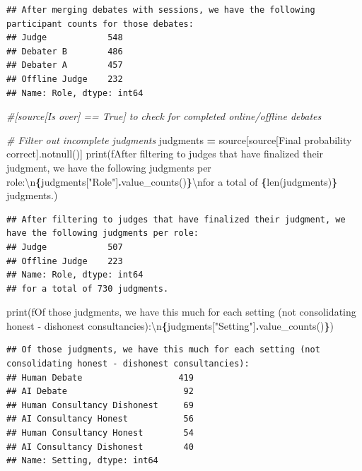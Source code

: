 \documentclass[
]{article}
\newenvironment{Shaded}{\begin{snugshade}}{\end{snugshade}}
\newcommand{\BuiltInTok}[1]{#1}
\newcommand{\CharTok}[1]{\textcolor[rgb]{0.31,0.60,0.02}{#1}}
\newcommand{\CommentTok}[1]{\textcolor[rgb]{0.56,0.35,0.01}{\textit{#1}}}
\newcommand{\NormalTok}[1]{#1}
\newcommand{\OperatorTok}[1]{\textcolor[rgb]{0.81,0.36,0.00}{\textbf{#1}}}
\newcommand{\SpecialCharTok}[1]{\textcolor[rgb]{0.81,0.36,0.00}{\textbf{#1}}}
\newcommand{\SpecialStringTok}[1]{\textcolor[rgb]{0.31,0.60,0.02}{#1}}
\newcommand{\StringTok}[1]{\textcolor[rgb]{0.31,0.60,0.02}{#1}}
\begin{document}
\begin{verbatim}
## After merging debates with sessions, we have the following participant counts for those debates:
## Judge            548
## Debater B        486
## Debater A        457
## Offline Judge    232
## Name: Role, dtype: int64
\end{verbatim}

\begin{Shaded}
\begin{Highlighting}[]
\CommentTok{\#[source[\textquotesingle{}Is over\textquotesingle{}] == True] to check for completed online/offline debates}

\CommentTok{\# Filter out incomplete judgments}
\NormalTok{judgments }\OperatorTok{=}\NormalTok{ source[source[}\StringTok{\textquotesingle{}Final probability correct\textquotesingle{}}\NormalTok{].notnull()]}
\BuiltInTok{print}\NormalTok{(}\SpecialStringTok{f\textquotesingle{}After filtering to judges that have finalized their judgment, we have the following judgments per role:}\CharTok{\textbackslash{}n}\SpecialCharTok{\{}\NormalTok{judgments[}\StringTok{"Role"}\NormalTok{]}\SpecialCharTok{.}\NormalTok{value\_counts()}\SpecialCharTok{\}}\CharTok{\textbackslash{}n}\SpecialStringTok{for a total of }\SpecialCharTok{\{}\BuiltInTok{len}\NormalTok{(judgments)}\SpecialCharTok{\}}\SpecialStringTok{ judgments.\textquotesingle{}}\NormalTok{)}
\end{Highlighting}
\end{Shaded}

\begin{verbatim}
## After filtering to judges that have finalized their judgment, we have the following judgments per role:
## Judge            507
## Offline Judge    223
## Name: Role, dtype: int64
## for a total of 730 judgments.
\end{verbatim}

\begin{Shaded}
\begin{Highlighting}[]
\BuiltInTok{print}\NormalTok{(}\SpecialStringTok{f\textquotesingle{}Of those judgments, we have this much for each setting (not consolidating honest {-} dishonest consultancies):}\CharTok{\textbackslash{}n}\SpecialCharTok{\{}\NormalTok{judgments[}\StringTok{"Setting"}\NormalTok{]}\SpecialCharTok{.}\NormalTok{value\_counts()}\SpecialCharTok{\}}\SpecialStringTok{\textquotesingle{}}\NormalTok{)}
\end{Highlighting}
\end{Shaded}

\begin{verbatim}
## Of those judgments, we have this much for each setting (not consolidating honest - dishonest consultancies):
## Human Debate                   419
## AI Debate                       92
## Human Consultancy Dishonest     69
## AI Consultancy Honest           56
## Human Consultancy Honest        54
## AI Consultancy Dishonest        40
## Name: Setting, dtype: int64
\end{verbatim}
\end{document}
